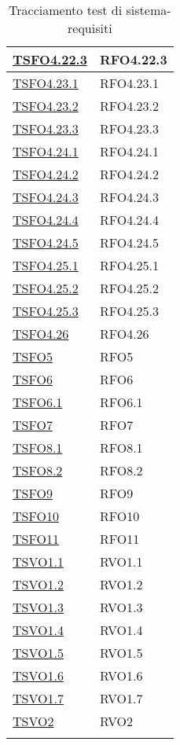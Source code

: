 \begin{longtable}{|>{\centering}m{5cm}|m{5cm}<{\centering}|}
\hyperlink{TSFO4.22.3}{TSFO4.22.3} & RFO4.22.3\\ \hline
\hyperlink{TSFO4.23.1}{TSFO4.23.1} & RFO4.23.1\\ \hline
\hyperlink{TSFO4.23.2}{TSFO4.23.2} & RFO4.23.2\\ \hline
\hyperlink{TSFO4.23.3}{TSFO4.23.3} & RFO4.23.3\\ \hline
\hyperlink{TSFO4.24.1}{TSFO4.24.1} & RFO4.24.1\\ \hline
\hyperlink{TSFO4.24.2}{TSFO4.24.2} & RFO4.24.2\\ \hline
\hyperlink{TSFO4.24.3}{TSFO4.24.3} & RFO4.24.3\\ \hline
\hyperlink{TSFO4.24.4}{TSFO4.24.4} & RFO4.24.4\\ \hline
\hyperlink{TSFO4.24.5}{TSFO4.24.5} & RFO4.24.5\\ \hline
\hyperlink{TSFO4.25.1}{TSFO4.25.1} & RFO4.25.1\\ \hline
\hyperlink{TSFO4.25.2}{TSFO4.25.2} & RFO4.25.2\\ \hline
\hyperlink{TSFO4.25.3}{TSFO4.25.3} & RFO4.25.3\\ \hline
\hyperlink{TSFO4.26}{TSFO4.26} & RFO4.26\\ \hline
\hyperlink{TSFO5}{TSFO5} & RFO5\\ \hline
\hyperlink{TSFO6}{TSFO6} & RFO6\\ \hline
\hyperlink{TSFO6.1}{TSFO6.1} & RFO6.1\\ \hline
\hyperlink{TSFO7}{TSFO7} & RFO7\\ \hline
\hyperlink{TSFO8.1}{TSFO8.1} & RFO8.1\\ \hline
\hyperlink{TSFO8.2}{TSFO8.2} & RFO8.2\\ \hline
\hyperlink{TSFO9}{TSFO9} & RFO9\\ \hline
\hyperlink{TSFO10}{TSFO10} & RFO10\\ \hline
\hyperlink{TSFO11}{TSFO11} & RFO11\\ \hline
\hyperlink{TSVO1.1}{TSVO1.1} & RVO1.1\\ \hline
\hyperlink{TSVO1.2}{TSVO1.2} & RVO1.2\\ \hline
\hyperlink{TSVO1.3}{TSVO1.3} & RVO1.3\\ \hline
\hyperlink{TSVO1.4}{TSVO1.4} & RVO1.4\\ \hline
\hyperlink{TSVO1.5}{TSVO1.5} & RVO1.5\\ \hline
\hyperlink{TSVO1.6}{TSVO1.6} & RVO1.6\\ \hline
\hyperlink{TSVO1.7}{TSVO1.7} & RVO1.7\\ \hline
\hyperlink{TSVO2}{TSVO2} & RVO2\\ \hline
\caption[Tracciamento test di sistema-requisiti]{Tracciamento test di sistema-requisiti}
\label{tab:ts-requi}
\end{longtable}
\clearpage



